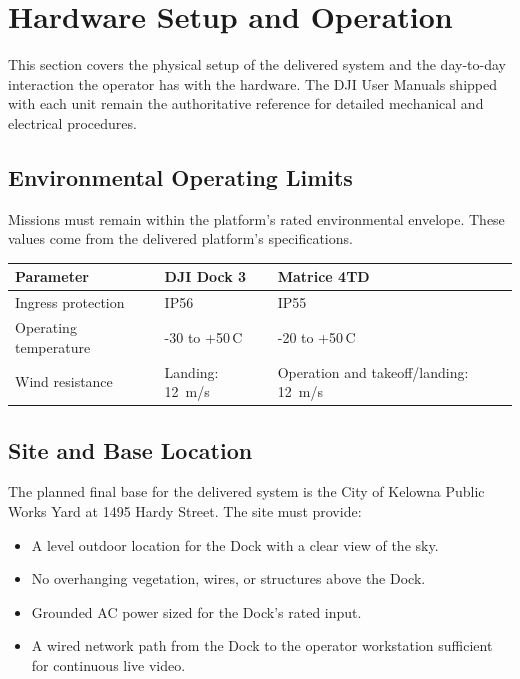\documentclass[11pt,letterpaper]{article}
\begin{document}
\section{Hardware Setup and Operation}

This section covers the physical setup of the delivered system and the
day-to-day interaction the operator has with the hardware. The DJI User
Manuals shipped with each unit remain the authoritative reference for
detailed mechanical and electrical procedures.

\subsection{Environmental Operating Limits}

Missions must remain within the platform's rated environmental
envelope. These values come from the delivered platform's
specifications.

\begin{tabular}{@{}p{4.5cm}p{4.8cm}p{4.8cm}@{}}
\toprule
\textbf{Parameter} & \textbf{DJI Dock 3} & \textbf{Matrice 4TD} \\
\midrule
Ingress protection    & IP56              & IP55 \\
Operating temperature & -30 to +50\,\textdegree{}C & -20 to +50\,\textdegree{}C \\
Wind resistance       & Landing: 12~m/s   & Operation and takeoff/landing: 12~m/s \\
\bottomrule
\end{tabular}

\subsection{Site and Base Location}

The planned final base for the delivered system is the City of Kelowna
Public Works Yard at 1495 Hardy Street. The site must provide:

\begin{itemize}[leftmargin=1.5em]
  \item A level outdoor location for the Dock with a clear view of the sky.
  \item No overhanging vegetation, wires, or structures above the Dock.
  \item Grounded AC power sized for the Dock's rated input.
  \item A wired network path from the Dock to the operator workstation
        sufficient for continuous live video.
\end{itemize}
\end{document}
